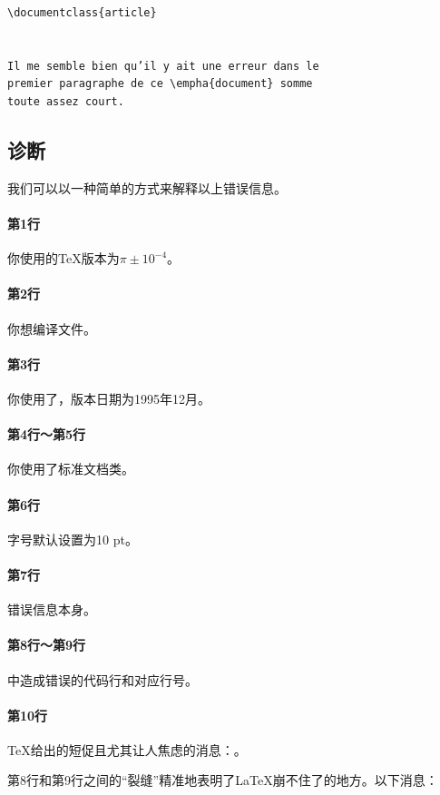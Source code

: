 \begin{dmd}
    \begin{verbatim}
\documentclass{article}


Il me semble bien qu’il y ait une erreur dans le
premier paragraphe de ce \empha{document} somme
toute assez court.

    \end{verbatim}
\end{dmd}

\subsection{诊断}

我们可以以一种简单的方式来解释以上错误信息。

\paragraph*{第1行}你使用的\TeX 版本为$\pi\pm 10^{-4}$。
\paragraph*{第2行}你想编译文件。
\paragraph*{第3行}你使用了\LaTeXe ，版本日期为1995年12月。
\paragraph*{第4行～第5行}你使用了标准文档类。
\paragraph*{第6行}字号默认设置为10 pt。
\paragraph*{第7行}错误信息本身。
\paragraph*{第8行～第9行}中造成错误的代码行和对应行号。
\paragraph*{第10行}\TeX 给出的短促且尤其让人焦虑的消息：。

第8行和第9行之间的“裂缝”精准地表明了\LaTeX 崩不住了的地方。以下消息：

